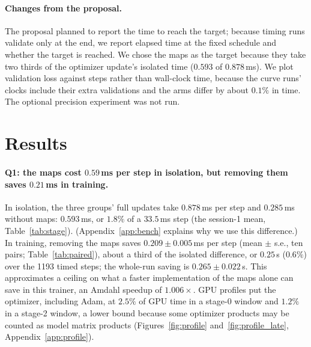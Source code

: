 \documentclass{article}
\begin{document}
\paragraph{Changes from the proposal.} The proposal planned to report the time to reach the target; because timing runs validate only at the end, we report elapsed time at the fixed schedule and whether the target is reached. We chose the maps as the target because they take two thirds of the optimizer update's isolated time ($0.593$ of $0.878$\,ms). We plot validation loss against steps rather than wall-clock time, because the curve runs' clocks include their extra validations and the arms differ by about $0.1\%$ in time. The optional precision experiment was not run.

\FloatBarrier
\section{Results}\label{sec:results}
\paragraph{Q1: the maps cost $0.59$\,ms per step in isolation, but removing them saves $0.21$\,ms in training.} In isolation, the three groups' full updates take $0.878$\,ms per step and $0.285$\,ms without maps: $0.593$\,ms, or $1.8\%$ of a $33.5$\,ms step (the session-1 mean, Table~\ref{tab:stage}). (Appendix~\ref{app:bench} explains why we use this difference.) In training, removing the maps saves $0.209\pm0.005$\,ms per step (mean $\pm$ s.e., ten pairs; Table~\ref{tab:paired}), about a third of the isolated difference, or $0.25$\,s ($0.6\%$) over the 1193 timed steps; the whole-run saving is $0.265\pm0.022$\,s. This approximates a ceiling on what a faster implementation of the maps alone can save in this trainer, an Amdahl speedup of $1.006\times$. GPU profiles put the optimizer, including Adam, at $2.5\%$ of GPU time in a stage-0 window and $1.2\%$ in a stage-2 window, a lower bound because some optimizer products may be counted as model matrix products (Figures~\ref{fig:profile} and~\ref{fig:profile_late}, Appendix~\ref{app:profile}).
\end{document}
